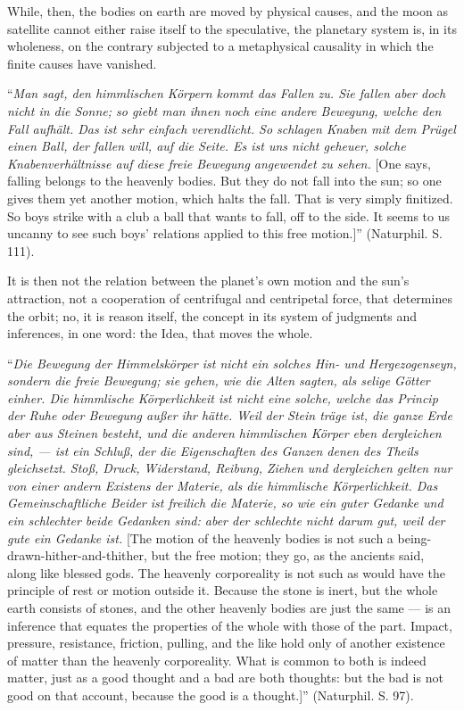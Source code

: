 \documentclass[12pt]{book}
\begin{document}
While, then, the bodies on earth are moved by physical causes, and the moon as satellite cannot either
raise itself to the speculative, the planetary system is, in its wholeness, on the contrary subjected to a
metaphysical causality in which the finite causes have vanished.

``\textit{Man sagt, den himmlischen Körpern kommt das Fallen zu. Sie fallen aber doch nicht in die Sonne;
so giebt man ihnen noch eine andere Bewegung, welche den Fall aufhält. Das ist sehr einfach verendlicht. So
schlagen Knaben mit dem Prügel einen Ball, der fallen will, auf die Seite. Es ist uns nicht geheuer, solche
Knabenverhältnisse auf diese freie Bewegung angewendet zu sehen.} [One says, falling belongs to the heavenly
bodies. But they do not fall into the sun; so one gives them yet another motion, which halts the fall. That
is very simply finitized. So boys strike with a club a ball that wants to fall, off to the side. It seems to
us uncanny to see such boys' relations applied to this free motion.]'' (Naturphil. S. 111).

It is then not the relation between the planet's own motion and the sun's attraction, not a cooperation of
centrifugal and centripetal force, that determines the orbit;
no, it is reason itself, the concept in its system of judgments and inferences, in one word: the Idea, that
moves the whole.

``\textit{Die Bewegung der Himmelskörper ist nicht ein solches Hin- und Hergezogenseyn, sondern die freie
Bewegung; sie gehen, wie die Alten sagten, als selige Götter einher. Die himmlische Körperlichkeit ist
nicht eine solche, welche das Princip der Ruhe oder Bewegung außer ihr hätte. Weil der Stein träge ist, die
ganze Erde aber aus Steinen besteht, und die anderen himmlischen Körper eben dergleichen sind, --- ist ein
Schluß, der die Eigenschaften des Ganzen denen des Theils gleichsetzt. Stoß, Druck, Widerstand, Reibung,
Ziehen und dergleichen gelten nur von einer andern Existens der Materie, als die himmlische Körperlichkeit.
Das Gemeinschaftliche Beider ist freilich die Materie, so wie ein guter Gedanke und ein schlechter beide
Gedanken sind: aber der schlechte nicht darum gut, weil der gute ein Gedanke ist.} [The motion of the
heavenly bodies is not such a being-drawn-hither-and-thither, but the free motion; they go, as the ancients
said, along like blessed gods. The heavenly corporeality is not such as would have the principle of rest or
motion outside it. Because the stone is inert, but the whole earth consists of stones, and the other
heavenly bodies are just the same --- is an inference that equates the properties of the whole with those of
the part. Impact, pressure, resistance, friction, pulling, and the like hold only of another existence of
matter than the heavenly corporeality. What is common to both is indeed matter, just as a good thought and a
bad are both thoughts: but the bad is not good on that account, because the good is a thought.]'' (Naturphil.
S. 97).
\end{document}
